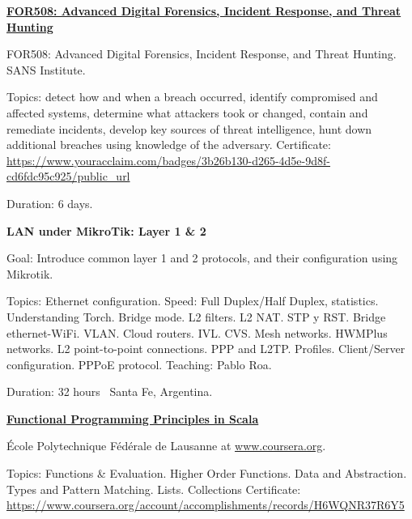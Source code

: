 \documentclass[letterpaper,MMMyyyy,nonstop]{simpleresumecv}
\begin{document}
\begin{body}
\BigGap
\href{https://www.sans.org/course/advanced-incident-response-threat-hunting-training}{\textbf{FOR508: Advanced Digital Forensics, Incident Response, and Threat Hunting}}
\hfill
{}

\BulletItem FOR508: Advanced Digital Forensics, Incident Response, and Threat Hunting. SANS Institute.
\begin{detail}
	\SubBulletItem 
	Topics: detect how and when a breach occurred, identify compromised and affected systems, determine what attackers took or changed, contain and remediate incidents, develop key sources of threat intelligence, hunt down additional breaches using knowledge of the adversary.	
	\SubBulletItem
	Certificate: \href{https://www.youracclaim.com/badges/3b26b130-d265-4d5e-9d8f-cd6fdc95c925/public\_url}{https://www.youracclaim.com/badges/3b26b130-d265-4d5e-9d8f-cd6fdc95c925/public\_url}
\end{detail}
Duration: 6 days.

\BigGap
\textbf{LAN under MikroTik: Layer 1 \& 2}
\hfill
{}

\BulletItem Goal: Introduce common layer 1 and 2 protocols, and their configuration using Mikrotik.

\begin{detail}
	\SubBulletItem 
	Topics: Ethernet configuration. Speed: Full Duplex/Half Duplex, statistics. Understanding Torch. Bridge mode.  L2 filters. L2 NAT. STP y RST. Bridge ethernet-WiFi. VLAN. Cloud routers. IVL. CVS. Mesh networks. HWMPlus networks. L2 point-to-point connections. PPP and L2TP. Profiles. Client/Server configuration. PPPoE protocol.
	\SubBulletItem Teaching: Pablo Roa.
\end{detail}
Duration: 32 hours \SubBulletSymbol\, Santa Fe, Argentina.

\BigGap
\href{https://www.coursera.org/learn/progfun1}{\textbf{Functional Programming Principles in Scala}}
\hfill
{}

\BulletItem École Polytechnique Fédérale de Lausanne at \href{https://www.coursera.org/}{www.coursera.org}.
\begin{detail}
	\SubBulletItem
	Topics: Functions \& Evaluation. Higher Order Functions. Data and Abstraction. Types and Pattern Matching. Lists. Collections
	\SubBulletItem
	Certificate: \href{https://www.coursera.org/account/accomplishments/records/H6WQNR37R6Y5}
	{https://www.coursera.org/account/accomplishments/records/H6WQNR37R6Y5}
	

\end{detail}
\end{body}
\end{document}
